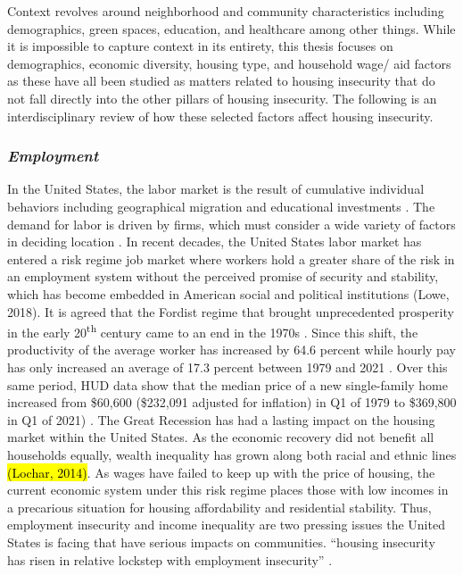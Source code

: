 Context revolves around neighborhood and community characteristics including demographics, green spaces, education, and healthcare among other things. While it is impossible to capture context in its entirety, this thesis focuses on demographics, economic diversity, housing type, and household wage/ aid factors as these have all been studied as matters related to housing insecurity that do not fall directly into the other pillars of housing insecurity. The following is an interdisciplinary review of how these selected factors affect housing insecurity.  

\subsubsection{\textit{Employment}}

In the United States, the labor market is the result of cumulative individual behaviors including geographical migration and educational investments \citep{wiener_labor_2020}. The demand for labor is driven by firms, which must consider a wide variety of factors in deciding location \citep{partridge_persistent_2007}. In recent decades, the United States labor market has entered a risk regime job market where workers hold a greater share of the risk in an employment system without the perceived promise of security and stability, which has become embedded in American social and political institutions (Lowe, 2018). It is agreed that the Fordist regime that brought unprecedented prosperity in the early 20\textsuperscript{th} century came to an end in the 1970s \citep{stockhammer_stylized_2008}. Since this shift, the productivity of the average worker has increased by 64.6 percent while hourly pay has only increased an average of 17.3 percent between 1979 and 2021 \citep{noauthor_productivity-pay_2022}. Over this same period, HUD data show that the median price of a new single-family home increased from \$60,600 (\$232,091 adjusted for inflation) in Q1 of 1979 to \$369,800 in Q1 of 2021) \citep{us_census_bureau_median_1963}. The Great Recession has had a lasting impact on the housing market within the United States. As the economic recovery did not benefit all households equally, wealth inequality has grown along both racial and ethnic lines \hl{(Lochar, 2014)}. As wages have failed to keep up with the price of housing, the current economic system under this risk regime places those with low incomes in a precarious situation for housing affordability and residential stability. Thus, employment insecurity and income inequality are two pressing issues the United States is facing that have serious impacts on communities. “housing insecurity has risen in relative lockstep with employment insecurity” \citep[48]{desmond_housing_2016-1}.  

